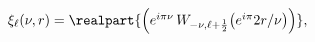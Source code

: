 $\xi_{\ell}(\nu,r)=\realpart{\left(e^{i\pi\nu}\mathop{W_{-\nu,\ell+\frac{1}{2}}%
\/}\nolimits\!\left(e^{i\pi}2r/\nu\right)\right)},$